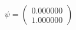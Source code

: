 \documentclass[preview]{standalone}
\begin{document}
\begin{align*}
\psi = \begin{pmatrix} 0.000000 \\ 1.000000 \end{pmatrix}
\end{align*}
\end{document}
